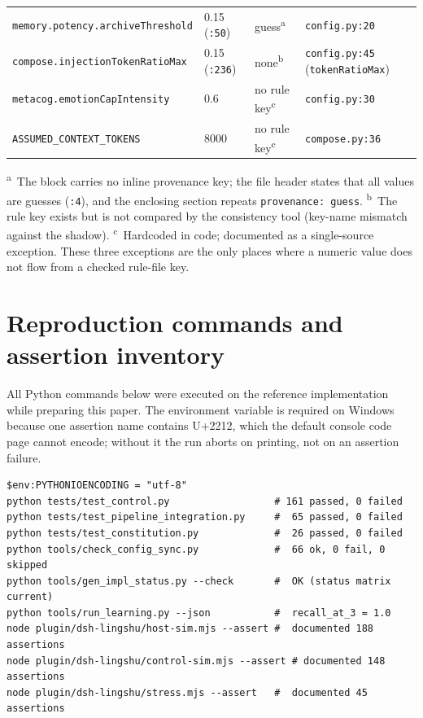 \begin{table}[t]
\begin{tabular}{@{}p{}p{}p{}p{}@{}}
\texttt{memory.\allowbreak{}potency.\allowbreak{}archiveThreshold} & 0.15 (\texttt{:50}) & guess\textsuperscript{a} & \texttt{config.py:20} \\
\texttt{compose.\allowbreak{}injectionTokenRatioMax} & 0.15 (\texttt{:236}) & none\textsuperscript{b} & \texttt{config.py:45} (\texttt{tokenRatioMax}) \\
\texttt{metacog.\allowbreak{}emotionCapIntensity} & 0.6 & no rule key\textsuperscript{c} & \texttt{config.py:30} \\
\texttt{ASSUMED\_\allowbreak{}CONTEXT\_\allowbreak{}TOKENS} & 8000 & no rule key\textsuperscript{c} & \texttt{compose.py:36} \\
\bottomrule
\end{tabular}
\end{table}

\noindent\textsuperscript{a}~The block carries no inline provenance key; the
file header states that all values are guesses (\texttt{:4}), and the enclosing
section repeats \texttt{provenance: guess}.
\textsuperscript{b}~The rule key exists but is not compared by the
consistency tool (key-name mismatch against the shadow).
\textsuperscript{c}~Hardcoded in code; documented as a single-source exception.
These three exceptions are the only places where a numeric value does not flow
from a checked rule-file key.

\section{Reproduction commands and assertion inventory}\label{sec:app:repro}

All Python commands below were executed on the reference implementation while
preparing this paper. The environment variable is required on Windows because
one assertion name contains U+2212, which the default console code page cannot
encode; without it the run aborts on printing, not on an assertion failure.

\begin{lstlisting}
$env:PYTHONIOENCODING = "utf-8"
python tests/test_control.py                  # 161 passed, 0 failed
python tests/test_pipeline_integration.py     #  65 passed, 0 failed
python tests/test_constitution.py             #  26 passed, 0 failed
python tools/check_config_sync.py             #  66 ok, 0 fail, 0 skipped
python tools/gen_impl_status.py --check       #  OK (status matrix current)
python tools/run_learning.py --json           #  recall_at_3 = 1.0
node plugin/dsh-lingshu/host-sim.mjs --assert #  documented 188 assertions
node plugin/dsh-lingshu/control-sim.mjs --assert # documented 148 assertions
node plugin/dsh-lingshu/stress.mjs --assert   #  documented 45 assertions
\end{lstlisting}


